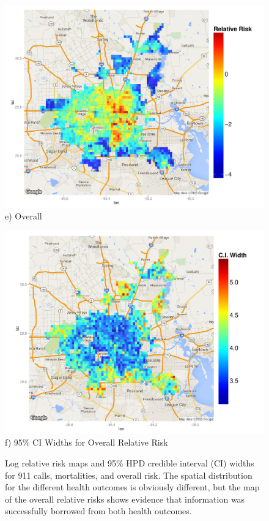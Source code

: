 \documentclass[final]{statsoc}
\begin{document}
\begin{figure}
\begin{minipage}[t]{0.48\textwidth}
    \centering
    \includegraphics[width=1.0\textwidth]{./imgs/overall_rr.pdf}
    e) Overall
  \end{minipage}
  \hfill
  \begin{minipage}[t]{0.48\textwidth}
    \centering
    \includegraphics[width=1.0\textwidth]{imgs/overall_ciwidths.pdf}
    f) 95\% CI Widths for Overall Relative Risk
  \end{minipage}
  \caption{Log relative risk maps and 95\% HPD credible interval (CI) widths for 911 calls, mortalities, and overall risk. The spatial distribution for the different health outcomes is obviously different, but the map of the overall relative risks shows evidence that information was successfully borrowed from both health outcomes.}
  \label{relative_risks}
\end{figure}
\end{document}
